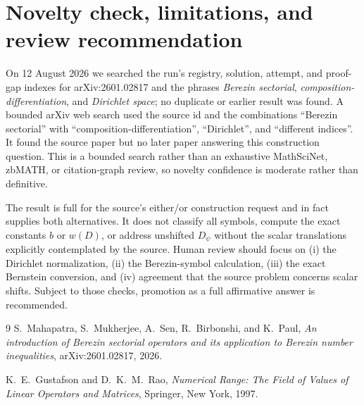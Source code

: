\documentclass[11pt]{amsart}
\theoremstyle{definition}
\begin{document}
\section{Novelty check, limitations, and review recommendation}

On 12 August 2026 we searched the run's registry, solution, attempt, and
proof-gap indexes for arXiv:2601.02817 and the phrases \emph{Berezin
sectorial}, \emph{composition-differentiation}, and \emph{Dirichlet space};
no duplicate or earlier result was found.  A bounded arXiv web search used the
source id and the combinations ``Berezin sectorial'' with
``composition-differentiation'', ``Dirichlet'', and ``different indices''.
It found the source paper but no later paper answering this construction
question.  This is a bounded search rather than an exhaustive MathSciNet,
zbMATH, or citation-graph review, so novelty confidence is moderate rather
than definitive.

The result is full for the source's either/or construction request and in fact
supplies both alternatives.  It does not classify all symbols, compute the
exact constants \(b\) or \(w(D)\), or address unshifted \(D_\psi\) without
the scalar translations explicitly contemplated by the source.  Human review
should focus on (i) the Dirichlet normalization, (ii) the Berezin-symbol
calculation, (iii) the exact Bernstein conversion, and (iv) agreement that the
source problem concerns scalar shifts.  Subject to those checks, promotion as
a full affirmative answer is recommended.

\begin{thebibliography}{9}
S.~Mahapatra, S.~Mukherjee, A.~Sen, R.~Birbonshi, and K.~Paul,
\emph{An introduction of Berezin sectorial operators and its application to
Berezin number inequalities}, arXiv:2601.02817, 2026.

K.~E.~Gustafson and D.~K.~M.~Rao,
\emph{Numerical Range: The Field of Values of Linear Operators and Matrices},
Springer, New York, 1997.
\end{thebibliography}
\end{document}
